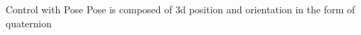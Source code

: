 \section{}
    \begin{frame}[allowframebreaks]{Control with Pose}
        Pose is composed of 3d position and orientation in the form of quaternion
    \end{frame}
    
    \subsection{}
        
        
        
        
